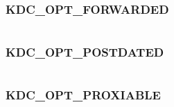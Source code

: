 \documentclass[letterpaper,10pt,english]{sphinxmanual}
\begin{document}
\begin{tabulary}{\linewidth}{|L|L|}
\hline

 & 
\\\hline
\end{tabulary}



\subsubsection{KDC\_OPT\_FORWARDED}
\label{appdev/refs/macros/KDC_OPT_FORWARDED::doc}\label{appdev/refs/macros/KDC_OPT_FORWARDED:kdc-opt-forwarded}\label{appdev/refs/macros/KDC_OPT_FORWARDED:kdc-opt-forwarded-data}

\begin{fulllineitems}
\label{appdev/refs/macros/KDC_OPT_FORWARDED:KDC_OPT_FORWARDED}
\end{fulllineitems}


\begin{tabulary}{\linewidth}{|L|L|}
\hline

 & 
\\\hline
\end{tabulary}



\subsubsection{KDC\_OPT\_POSTDATED}
\label{appdev/refs/macros/KDC_OPT_POSTDATED:kdc-opt-postdated-data}\label{appdev/refs/macros/KDC_OPT_POSTDATED:kdc-opt-postdated}\label{appdev/refs/macros/KDC_OPT_POSTDATED::doc}

\begin{fulllineitems}
\label{appdev/refs/macros/KDC_OPT_POSTDATED:KDC_OPT_POSTDATED}
\end{fulllineitems}


\begin{tabulary}{\linewidth}{|L|L|}
\hline

 & 
\\\hline
\end{tabulary}



\subsubsection{KDC\_OPT\_PROXIABLE}
\label{appdev/refs/macros/KDC_OPT_PROXIABLE:kdc-opt-proxiable-data}\label{appdev/refs/macros/KDC_OPT_PROXIABLE::doc}\label{appdev/refs/macros/KDC_OPT_PROXIABLE:kdc-opt-proxiable}
\end{document}
